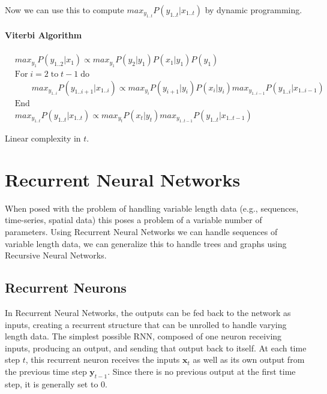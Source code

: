 \documentclass[12pt]{article}
\begin{document}
            Now we can use this to compute $max_{y_{1..t}} P(y_{1..t}|x_{1..t})$ by dynamic programming.

            \paragraph{Viterbi Algorithm}
                \begin{align*}
                    & max_{y_1} P(y_{1..2}|x_1) \propto max_{y_1} P(y_2|y_1)P(x_1|y_1)P(y_1) \\
                    & \text{For} \; i=2 \; \text{to} \; t-1 \; \text{do} \\
                    & \qquad max_{y_{1..i}} P(y_{1..i+1}|x_{1..i}) \propto max_{y_i} P(y_{i+1}|y_i)P(x_i|y_i) max_{y_{1..i-1}} P(y_{1..i} | x_{1..i-1}) \\
                    & \text{End} \\
                    & max_{y_{1..t}} P(y_{1..t}|x_{1..t}) \propto max_{y_t} P(x_t|y_t) max_{y_{1..t-1}} P(y_{1..t}|x_{1..t-1})
                \end{align*}
                
                Linear complexity in $t$.

\section{Recurrent Neural Networks} \label{sec:RNN}
    When posed with the problem of handling variable length data (e.g., sequences, time-series, spatial data) this poses
    a problem of a variable number of parameters. Using Recurrent Neural Networks we can handle sequences of variable
    length data, we can generalize this to handle trees and graphs using Recursive Neural Networks.

    \subsection{Recurrent Neurons}
        In Recurrent Neural Networks, the outputs can be fed back to the network as inputs, creating a recurrent
        structure that can be unrolled to handle varying length data. The simplest possible RNN, composed of one neuron
        receiving inputs, producing an output, and sending that output back to itself. At each time step $t$, this
        recurrent neuron receives the inputs $\boldsymbol{x}_t$ as well as its own output from the previous time step
        $\boldsymbol{y}_{t-1}$. Since there is no previous output at the first time step, it is generally set to 0. 
\end{document}
